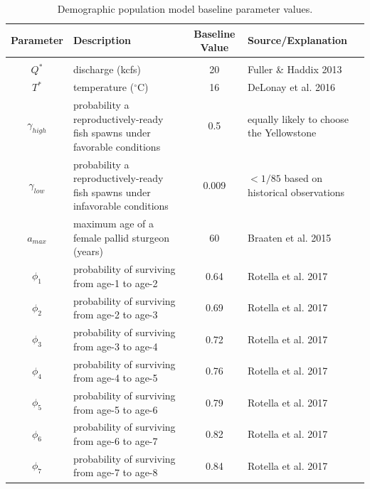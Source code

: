 \documentclass[12pt]{article}
\begin{document}
\setlength{\LTcapwidth}{0.76\textwidth}
\begin{longtable}{cp{5.5cm}cp{5cm}}
\caption{Demographic population model baseline parameter values.}\\
\hline
Parameter & \hspace{1.5cm} Description & Baseline Value &  \hspace{0.5cm} Source/Explanation\\
\hline
& & & \\
$Q^{*}$ & discharge (kcfs) \newline &  20 & Fuller \& Haddix 2013\\
$T^{*}$ & temperature ($^{\circ}$C) \newline & 16 & DeLonay et al. 2016 \\
$\gamma_{high}$ & probability a reproductively-ready fish spawns under favorable conditions \newline & 0.5 & equally likely to choose the Yellowstone\\
$\gamma_{low}$ & probability a reproductively-ready fish spawns under infavorable conditions \newline & 0.009 &  $<1/85$ based on historical observations\\
$a_{max}$ & maximum age of a female pallid sturgeon (years) \newline & 60 & Braaten et al. 2015\\
$\phi_1$ & probability of surviving from age-1 to age-2 \newline & 0.64 & Rotella et al. 2017\\
$\phi_2$ & probability of surviving from age-2 to age-3 \newline & 0.69 & Rotella et al. 2017\\
$\phi_3$ & probability of surviving from age-3 to age-4 \newline & 0.72 & Rotella et al. 2017\\
$\phi_4$ & probability of surviving from age-4 to age-5 \newline & 0.76 & Rotella et al. 2017\\
$\phi_5$ & probability of surviving from age-5 to age-6 \newline & 0.79 & Rotella et al. 2017\\
$\phi_6$ & probability of surviving from age-6 to age-7 \newline & 0.82 & Rotella et al. 2017\\
$\phi_7$ & probability of surviving from age-7 to age-8 \newline & 0.84 & Rotella et al. 2017\\

\end{longtable}
\end{document}
